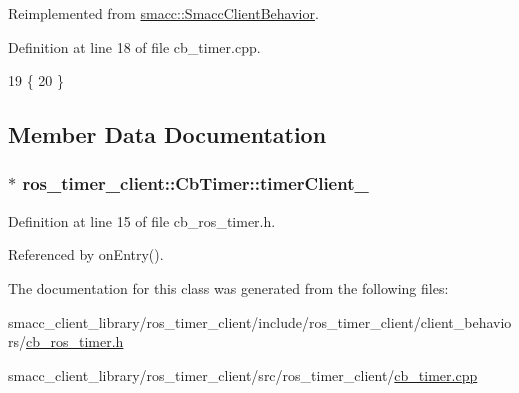 Reimplemented from \hyperlink{classsmacc_1_1SmaccClientBehavior_ac0cd72d42bd00425362a97c9803ecce5}{smacc\+::\+Smacc\+Client\+Behavior}.



Definition at line 18 of file cb\+\_\+timer.\+cpp.


\begin{DoxyCode}
19 \{
20 \}
\end{DoxyCode}


\subsection{Member Data Documentation}
\subsubsection[{\texorpdfstring{timer\+Client\+\_\+}{timerClient_}}]{$\ast$ ros\+\_\+timer\+\_\+client\+::\+Cb\+Timer\+::timer\+Client\+\_\+\hspace{0.3cm}{\ttfamily [private]}}\hypertarget{classros__timer__client_1_1CbTimer_a370d115a7423db45ca375673db8a4ed1}{}\label{classros__timer__client_1_1CbTimer_a370d115a7423db45ca375673db8a4ed1}


Definition at line 15 of file cb\+\_\+ros\+\_\+timer.\+h.



Referenced by on\+Entry().



The documentation for this class was generated from the following files\+:\begin{DoxyCompactItemize}
\item 
smacc\+\_\+client\+\_\+library/ros\+\_\+timer\+\_\+client/include/ros\+\_\+timer\+\_\+client/client\+\_\+behaviors/\hyperlink{cb__ros__timer_8h}{cb\+\_\+ros\+\_\+timer.\+h}\item 
smacc\+\_\+client\+\_\+library/ros\+\_\+timer\+\_\+client/src/ros\+\_\+timer\+\_\+client/\hyperlink{cb__timer_8cpp}{cb\+\_\+timer.\+cpp}\end{DoxyCompactItemize}
